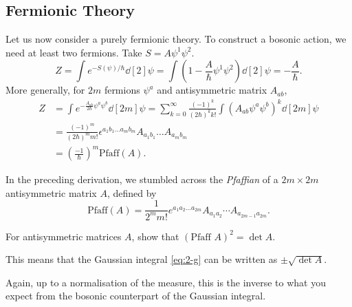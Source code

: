 \subsection{Fermionic Theory}%
\label{sub:fermionic_theory}

Let us now consider a purely fermionic theory. To construct a bosonic action, we need at least two fermions.
Take $S = A \psi^1 \psi^2$.
\begin{equation}
  Z = \int e^{-S (\psi) / \hbar} \dd[2]{\psi} = \int \left( 1 - \frac{A}{\hbar} \psi^1 \psi^2 \right) \dd[2]{\psi} = - \frac{A}{\hbar}.
\end{equation}
More generally, for $2m$  fermions $\psi^{a}$  and antisymmetric matrix $A_{ab}$,
\begin{align}
  Z &= \int e^{-\frac{A_{ab}}{2 \hbar} \psi^a \psi^{b}} \dd[2m]{\psi} = \sum_{k = 0}^{\infty} \frac{(-1)^k}{(2 \hbar)^k k!} \int (A_{ab} \psi^{a} \psi^{b})^k \dd[2m]{\psi}  \\
    &= \frac{(-1)^m}{(2 \hbar)^{m} m!} \epsilon^{a_1 b_1 \dots a_m b_m} A_{a_1 b_1 } \dots A_{a_m b_m} \\
    &= \left( \frac{-1}{\hbar} \right)^m \text{Pfaff}(A).
    \label{eq:2-g}
\end{align}
\begin{definition}[Pfaffian]
  In the preceding derivation, we stumbled across the \emph{Pfaffian} of a $2m \times 2m$ antisymmetric matrix $A$, defined by
  \begin{equation}
    \text{Pfaff}(A) = \frac{1}{2^m m!} e^{a_1 a_2 \dots a_{2m}} A_{a_1 a_2} \cdots A_{a_{2m-1} a_{2m}}.
  \end{equation}
\end{definition}
\begin{exercise}
  For antisymmetric matrices $A$, show that $(\text{Pfaff } A)^2 = \det A$.
\end{exercise}
This means that the Gaussian integral \eqref{eq:2-g} can be written as $\pm \sqrt{\det A}$.
\begin{leftbar}
  \begin{remark}
    Again, up to a normalisation of the measure, this is the inverse to what you expect from the bosonic counterpart of the Gaussian integral.
  \end{remark}
\end{leftbar}
